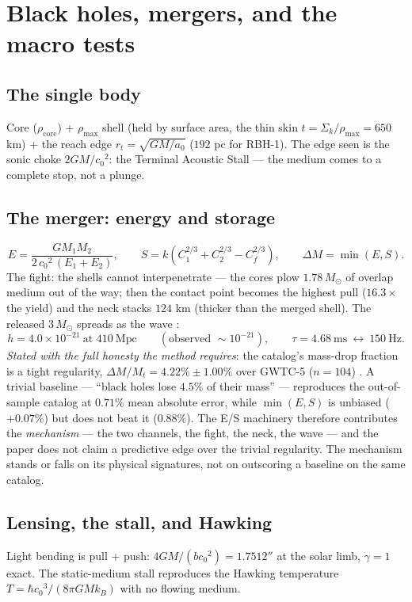 \documentclass[11pt, a4paper]{article}
\newcommand{\cnot}{\ensuremath{c_0}}
\newcommand{\rhomax}{\ensuremath{\rho_{\mathrm{max}}}}
\newcommand{\rhocore}{\ensuremath{\rho_{\mathrm{core}}}}
\begin{document}
\section{Black holes, mergers, and the macro tests}

\subsection{The single body}
Core ($\rhocore$) + $\rhomax$ shell (held by surface area, the thin skin
$t = \Sigma_k/\rhomax = 650$ km) + the reach edge
$r_t = \sqrt{GM/a_0}$ ($192$ pc for RBH-1). The edge seen is the sonic choke
$2GM/\cnot^2$: the Terminal Acoustic Stall --- the medium comes to a complete
stop, not a plunge.

\subsection{The merger: energy and storage}
\begin{equation}
E = \frac{G M_1 M_2}{2\,\cnot^2\,(E_1+E_2)}, \qquad
S = k\left(C_1^{2/3}+C_2^{2/3}-C_f^{2/3}\right), \qquad
\Delta M = \min(E,S).
\end{equation}
The fight: the shells cannot interpenetrate --- the cores plow $1.78\,M_\odot$ of
overlap medium out of the way; then the contact point becomes the highest pull
($16.3\times$ the yield) and the neck stacks $124$ km (thicker than the merged
shell). The released $3\,M_\odot$ spreads as the wave \cite{ligo2016}:
\begin{equation}
h = 4.0\times10^{-21}\ \text{at }410\ \text{Mpc}
\qquad (\text{observed } \sim10^{-21}),
\qquad
\tau = 4.68\ \text{ms}\ \leftrightarrow\ 150\ \text{Hz}.
\end{equation}
\emph{Stated with the full honesty the method requires}: the catalog's mass-drop
fraction is a tight regularity, $\Delta M/M_t = 4.22\% \pm 1.00\%$ over GWTC-5
($n=104$) \cite{ligo2023}. A trivial baseline --- ``black holes lose $4.5\%$ of their mass'' ---
reproduces the out-of-sample catalog at $0.71\%$ mean absolute error, while
$\min(E,S)$ is unbiased ($+0.07\%$) but does not beat it ($0.88\%$). The E/S
machinery therefore contributes the \emph{mechanism} --- the two channels, the
fight, the neck, the wave --- and the paper does not claim a predictive edge
over the trivial regularity. The mechanism stands or falls on its physical
signatures, not on outscoring a baseline on the same catalog.

\subsection{Lensing, the stall, and Hawking}
Light bending is pull + push: $4GM/(b\cnot^2) = 1.7512''$ at the solar limb,
$\gamma = 1$ exact. The static-medium stall reproduces the Hawking temperature
$T = \hbar\cnot^3/(8\pi GM k_B)$ with no flowing medium.
\end{document}
